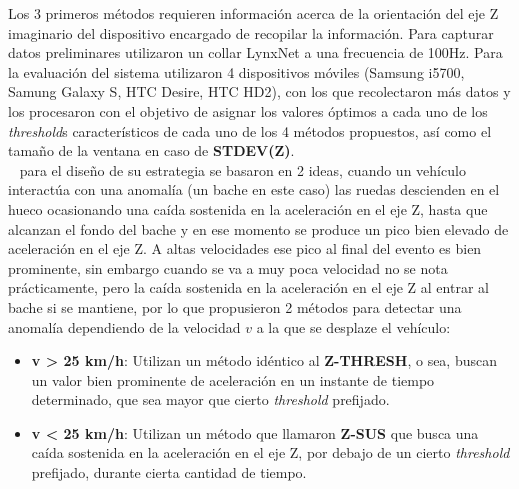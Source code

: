 Los 3 primeros métodos requieren información acerca de la orientación del eje Z imaginario del dispositivo encargado de recopilar la información. 
Para capturar datos preliminares utilizaron un collar LynxNet a una frecuencia de 100Hz. Para la evaluación del sistema utilizaron 4 dispositivos
móviles (Samsung i5700, Samung Galaxy S, HTC Desire, HTC HD2), con los que recolectaron más datos y los procesaron con el objetivo de asignar los 
valores óptimos a cada uno de los \emph{threshold}s característicos de cada uno de los 4 métodos propuestos, así como el tamaño de la ventana en caso de 
\textbf {STDEV(Z)}.\\

~ para el diseño de su estrategia se basaron en 2 ideas, cuando un vehículo interactúa con una
anomalía (un bache en este caso) las ruedas descienden en el hueco ocasionando una caída sostenida en la aceleración en el eje Z,
hasta que alcanzan el fondo del bache y en ese momento se produce un pico bien elevado de aceleración en el eje Z. A altas velocidades
ese pico al final del evento es bien prominente, sin embargo cuando se va a muy poca velocidad no se nota prácticamente, pero la caída
sostenida en la aceleración en el eje Z al entrar al bache si se mantiene, por lo que propusieron 2 métodos para detectar una anomalía
dependiendo de la velocidad $v$ a la que se desplaze el vehículo:\\

\begin{itemize}
	\item \textbf {v > 25 km/h}:  Utilizan un método idéntico al \textbf {Z-THRESH}, o sea, buscan un valor bien prominente de
		aceleración en un instante de tiempo determinado, que sea mayor que cierto \emph{threshold} prefijado.\\
	\item \textbf {v < 25 km/h}:  Utilizan un método que llamaron \textbf {Z-SUS} que busca una caída sostenida en la aceleración
		en el eje Z, por debajo de un cierto \emph{threshold} prefijado, durante cierta cantidad de tiempo.\\
\end{itemize}

